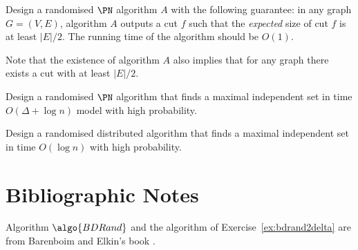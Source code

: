 \begin{ex}
    Design a randomised $\PN$ algorithm $A$ with the following guarantee: in any graph $G = (V,E)$, algorithm $A$ outputs a cut $f$ such that the \emph{expected} size of cut $f$ is at least $|E|/2$. The running time of the algorithm should be $O(1)$.

    Note that the existence of algorithm $A$ also implies that for any graph there exists a cut with at least $|E|/2$.

\end{ex}

\begin{ex}
    Design a randomised $\PN$ algorithm that finds a maximal independent set in time $O(\Delta + \log n)$ model with high probability.

\end{ex}

\begin{exs}
    Design a randomised distributed algorithm that finds a maximal independent set in time $O(\log n)$ with high probability.

\end{exs}



\section{Bibliographic Notes}

Algorithm $\algo{BDRand}$ and the algorithm of Exercise~\ref{ex:bdrand2delta} are from Barenboim and Elkin's book \cite[Section 10.1]{barenboim13distributed}.
